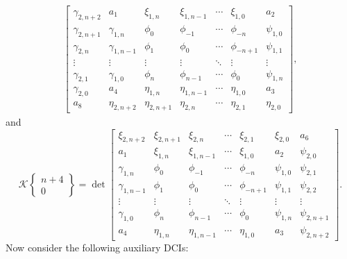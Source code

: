 \documentclass[10pt,a4paper]{amsart}
\numberwithin{equation}{section}
\newcommand{\ga}{\gamma}
\begin{document}
\begin{gather*}
\begin{bmatrix}
				\ga_{2,n+2} &	a_1 & \xi_{1,n} & \xi_{1,n-1} & \cdots & \xi_{1,0} & a_2 \\
				\ga_{2,n+1} &	\ga_{1,n} &	\phi_0& \phi_{-1} & \cdots & \phi_{-n} & \psi_{1,0} \\
				\ga_{2,n} &	\ga_{1,n-1} &	\phi_{1}& \phi_0 & \cdots & \phi_{-n+1} & \psi_{1,1} \\
				\vdots &	\vdots & \vdots & \vdots & \ddots & \vdots & \vdots \\
				\ga_{2,1} &	\ga_{1,0} &	\phi_{n} & \phi_{n-1} & \cdots & \phi_{0} & \psi_{1,n} \\
				\ga_{2,0} &	a_4 &	\eta_{1,n} & \eta_{1,n-1} & \cdots & \eta_{1,0} & a_3 \\
				a_8 &	\eta_{2,n+2} &	\eta_{2,n+1} & \eta_{2,n} & \cdots & \eta_{2,1} & \eta_{2,0}
			\end{bmatrix},
		\end{gather*}
		and
		\begin{equation*}
			\mathscr{K}\left\lbrace \begin{matrix} n+4 \\ 0 \end{matrix} \right\rbrace	= \det \begin{bmatrix}
				\xi_{2,n+2} & \xi_{2,n+1} & \xi_{2,n} & \cdots & \xi_{2,1} & \xi_{2,0} & a_6 \\
				a_1 & \xi_{1,n} & \xi_{1,n-1} & \cdots & \xi_{1,0} & a_2 & \psi_{2,0} \\
				\ga_{1,n} &	\phi_0& \phi_{-1} & \cdots & \phi_{-n} & \psi_{1,0} & \psi_{2,1} \\
				\ga_{1,n-1} &	\phi_{1}& \phi_0 & \cdots & \phi_{-n+1} & \psi_{1,1} & \psi_{2,2} \\
				\vdots & \vdots & \vdots & \ddots & \vdots & \vdots & \vdots \\
				\ga_{1,0} &	\phi_{n} & \phi_{n-1} & \cdots & \phi_{0} & \psi_{1,n} & \psi_{2,n+1} \\
				a_4 &	\eta_{1,n} & \eta_{1,n-1} & \cdots & \eta_{1,0} & a_3 & \psi_{2,n+2} 			\end{bmatrix}.
		\end{equation*}
		Now consider the following auxiliary DCIs:
\end{document}

